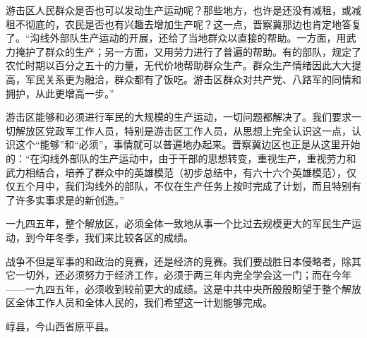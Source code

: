 游击区人民群众是否也可以发动生产运动呢？那些地方，也许是还没有减租，或减租不彻底的，农民是否也有兴趣去增加生产呢？这一点，晋察冀那边也肯定地答复了。“沟线外部队生产运动的开展，还给了当地群众以直接的帮助。一方面，用武力掩护了群众的生产；另一方面，又用劳力进行了普遍的帮助。有的部队，规定了农忙时期以百分之五十的力量，无代价地帮助群众生产。群众生产情绪因此大大提高，军民关系更为融洽，群众都有了饭吃。游击区群众对共产党、八路军的同情和拥护，从此更增高一步。”

游击区能够和必须进行军民的大规模的生产运动，一切问题都解决了。我们要求一切解放区党政军工作人员，特别是游击区工作人员，从思想上完全认识这一点，认识这个“能够”和“必须”，事情就可以普遍地办起来。晋察冀边区也正是从这里开始的：“在沟线外部队的生产运动中，由于干部的思想转变，重视生产，重视劳力和武力相结合，培养了群众中的英雄模范（初步总结中，有六十六个英雄模范），仅仅五个月中，我们沟线外的部队，不仅在生产任务上按时完成了计划，而且特别有了许多实事求是的新创造。”

一九四五年，整个解放区，必须全体一致地从事一个比过去规模更大的军民生产运动，到今年冬季，我们来比较各区的成绩。

战争不但是军事的和政治的竞赛，还是经济的竞赛。我们要战胜日本侵略者，除其它一切外，还必须努力于经济工作，必须于两三年内完全学会这一门；而在今年——一九四五年，必须收到较前更大的成绩。这是中共中央所殷殷盼望于整个解放区全体工作人员和全体人民的，我们希望这一计划能够完成。


\begin{maonote}
崞县，今山西省原平县。
\end{maonote}
